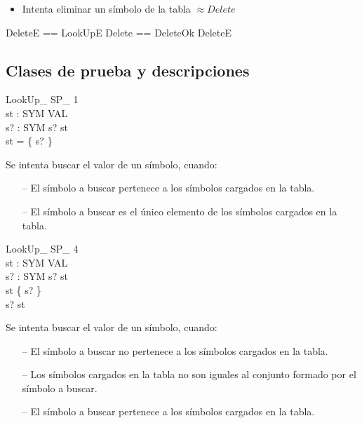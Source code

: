 \begin{itemize}
  \item Intenta eliminar un símbolo de la tabla $\approx Delete$ 
\end{itemize}

\begin{zed}
DeleteE == LookUpE \also
Delete == DeleteOk \lor DeleteE
\end{zed}

\subsection*{Clases de prueba y descripciones}

\begin{schema}{LookUp\_ SP\_ 1}\\
 st : SYM \pfun VAL \\
 s? : SYM 
\where
 s? \in \dom st \\
 \dom st = \{ s? \}
\end{schema}

\begin{tcolorbox}[colback=gray!5!white,colframe=gray!50!black,
  colbacktitle=gray!75!black,title=LookUp\_ SP\_ 1]
  Se intenta buscar el valor de un símbolo, cuando:
     \begin{itemize}
        \item[--]{El símbolo a buscar pertenece a los símbolos cargados en la tabla.}
        \item[--]{El símbolo a buscar es el único elemento de los símbolos cargados en la tabla.}
     \end{itemize}
\end{tcolorbox}

\begin{schema}{LookUp\_ SP\_ 4}\\
 st : SYM \pfun VAL \\
 s? : SYM 
\where
 s? \notin \dom st \\
 \dom st \neq \{ s? \} \\
 s? \in \dom st
\end{schema}

\begin{tcolorbox}[colback=gray!5!white,colframe=gray!50!black,
  colbacktitle=gray!75!black,title=LookUp\_ SP\_ 4]
  Se intenta buscar el valor de un símbolo, cuando:
     \begin{itemize}
        \item[--]{El símbolo a buscar no pertenece a los símbolos cargados en la tabla.}
        \item[--]{Los símbolos cargados en la tabla no son iguales al conjunto formado por el símbolo a buscar.}
        \item[--]{El símbolo a buscar pertenece a los símbolos cargados en la tabla.}
     \end{itemize}
\end{tcolorbox}


